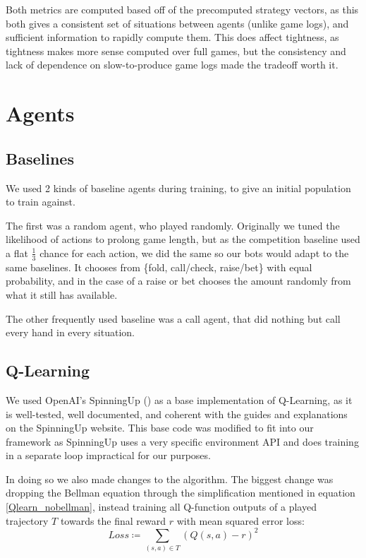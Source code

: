 Both metrics are computed based off of the precomputed strategy vectors, as this both gives a consistent set of situations between agents (unlike game logs), and sufficient information to rapidly compute them. This does affect tightness, as tightness makes more sense computed over full games, but the consistency and lack of dependence on slow-to-produce game logs made the tradeoff worth it.

\section{Agents}

\subsection{Baselines}
We used 2 kinds of baseline agents during training, to give an initial population to train against.

The first was a random agent, who played randomly. Originally we tuned the likelihood of actions to prolong game length, but as the competition baseline used a flat $\frac{1}{3}$ chance for each action, we did the same so our bots would adapt to the same baselines. It chooses from \{fold, call/check, raise/bet\} with equal probability, and in the case of a raise or bet chooses the amount randomly from what it still has available.

The other frequently used baseline was a call agent, that did nothing but call every hand in every situation.

\subsection{Q-Learning}
We used OpenAI's SpinningUp (\cite{SpinningUp2018}) as a base implementation of Q-Learning, as it is well-tested, well documented, and coherent with the guides and explanations on the SpinningUp website. This base code was modified to fit into our framework as SpinningUp uses a very specific environment API and does training in a separate loop impractical for our purposes.

In doing so we also made changes to the algorithm. The biggest change was dropping the Bellman equation through the simplification mentioned in equation \ref{Qlearn_nobellman}, instead training all Q-function outputs of a played trajectory $T$ towards the final reward $r$ with mean squared error loss:
\begin{equation}
    Loss \coloneqq \sum_{(s, a) \in T} (Q(s, a) - r)^2
\end{equation}

